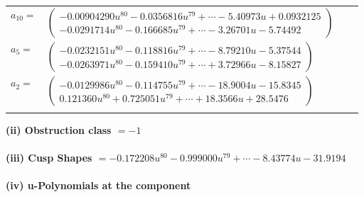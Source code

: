 \documentclass[1p]{elsarticle_modified}
\theoremstyle{definition}
\begin{document}
\begin{tabular}{m{7pt} m{180pt} m{7pt} m{180pt} }
\flushright $a_{10}=$&$\begin{pmatrix}-0.00904290 u^{80}-0.0356816 u^{79}+\cdots-5.40973 u+0.0932125\\-0.0291714 u^{80}-0.166685 u^{79}+\cdots-3.26701 u-5.74492\end{pmatrix}$ \\
\flushright $a_{5}=$&$\begin{pmatrix}-0.0232151 u^{80}-0.118816 u^{79}+\cdots-8.79210 u-5.37544\\-0.0263971 u^{80}-0.159410 u^{79}+\cdots+3.72966 u-8.15827\end{pmatrix}$ \\
\flushright $a_{2}=$&$\begin{pmatrix}-0.0129986 u^{80}-0.114755 u^{79}+\cdots-18.9004 u-15.8345\\0.121360 u^{80}+0.725051 u^{79}+\cdots+18.3566 u+28.5476\end{pmatrix}$\\&\end{tabular}
\flushleft \textbf{(ii) Obstruction class $= -1$}\\~\\
\flushleft \textbf{(iii) Cusp Shapes $= -0.172208 u^{80}-0.999000 u^{79}+\cdots-8.43774 u-31.9194$}\\~\\
\newpage\renewcommand{\arraystretch}{1}
\flushleft \textbf{(iv) u-Polynomials at the component}\newline \\
\end{document}

